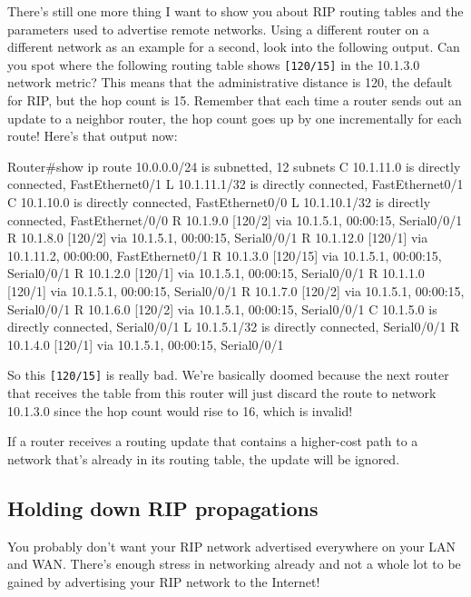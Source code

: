 There's still one more thing I want to show you about RIP routing tables
and the parameters used to advertise remote networks. Using a different
router on a different network as an example for a second, look into the
following output. Can you spot where the following routing table shows
\texttt{{[}120/15{]}} in the 10.1.3.0 network metric? This means that
the administrative distance is 120, the default for RIP, but the hop
count is 15. Remember that each time a router sends out an update to a
neighbor router, the hop count goes up by one incrementally for each
route! Here's that output now:

\begin{cli}
Router#show ip route
     10.0.0.0/24 is subnetted, 12 subnets
C       10.1.11.0 is directly connected, FastEthernet0/1
L       10.1.11.1/32 is directly connected, FastEthernet0/1
C       10.1.10.0 is directly connected, FastEthernet0/0
L       10.1.10.1/32 is directly connected, FastEthernet/0/0
R       10.1.9.0 [120/2] via 10.1.5.1, 00:00:15, Serial0/0/1
R       10.1.8.0 [120/2] via 10.1.5.1, 00:00:15, Serial0/0/1
R       10.1.12.0 [120/1] via 10.1.11.2, 00:00:00, FastEthernet0/1
R      10.1.3.0 [120/15] via 10.1.5.1, 00:00:15, Serial0/0/1
R       10.1.2.0 [120/1] via 10.1.5.1, 00:00:15, Serial0/0/1
R       10.1.1.0 [120/1] via 10.1.5.1, 00:00:15, Serial0/0/1
R       10.1.7.0 [120/2] via 10.1.5.1, 00:00:15, Serial0/0/1
R       10.1.6.0 [120/2] via 10.1.5.1, 00:00:15, Serial0/0/1
C       10.1.5.0 is directly connected, Serial0/0/1
L       10.1.5.1/32 is directly connected, Serial0/0/1
R       10.1.4.0 [120/1] via 10.1.5.1, 00:00:15, Serial0/0/1
\end{cli}

So this \texttt{{[}120/15{]}} is really bad. We're basically doomed
because the next router that receives the table from this router will
just discard the route to network 10.1.3.0 since the hop count would
rise to 16, which is invalid!

\begin{note}
If a router receives a routing update that contains a higher-cost path to a network that's already in its routing table, the update will be ignored.
\end{note}

\subsection{Holding down RIP propagations}

You probably don't want your RIP network advertised everywhere on your
LAN and WAN. There's enough stress in networking already and not a whole
lot to be gained by advertising your RIP network to the Internet!

